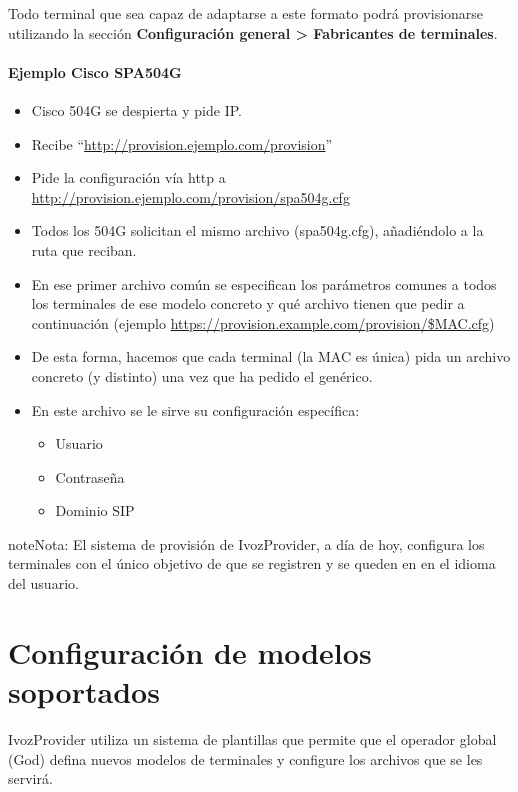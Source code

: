 \documentclass[letterpaper,10pt,spanish]{sphinxmanual}
\begin{document}
Todo terminal que sea capaz de adaptarse a este formato podrá provisionarse utilizando la sección \textbf{Configuración general \textgreater{} Fabricantes de terminales}.
\paragraph{Ejemplo Cisco SPA504G}
\begin{itemize}
\item {} 
Cisco 504G se despierta y pide IP.

\item {} 
Recibe “\url{http://provision.ejemplo.com/provision}”

\item {} 
Pide la configuración vía http a \url{http://provision.ejemplo.com/provision/spa504g.cfg}

\item {} 
Todos los 504G solicitan el mismo archivo (spa504g.cfg), añadiéndolo a la ruta que reciban.

\item {} 
En ese primer archivo común se especifican los parámetros comunes a todos los terminales de ese modelo concreto y qué archivo tienen que pedir a continuación (ejemplo \url{https://provision.example.com/provision/\$MAC.cfg})

\item {} 
De esta forma, hacemos que cada terminal (la MAC es única) pida un archivo concreto (y distinto) una vez que ha pedido el genérico.

\item {} 
En este archivo se le sirve su configuración específica:
\begin{itemize}
\item {} 
Usuario

\item {} 
Contraseña

\item {} 
Dominio SIP

\end{itemize}

\end{itemize}

\begin{notice}{note}{Nota:}
El sistema de provisión de IvozProvider, a día de hoy, configura los terminales con el único objetivo de que se registren y se queden en en el idioma del usuario.
\end{notice}


\section{Configuración de modelos soportados}
\label{provisioning/index:configuration-of-supported-models}
IvozProvider utiliza un sistema de plantillas que permite que el operador global (God) defina nuevos modelos de terminales y configure los archivos que se les servirá.
\end{document}
